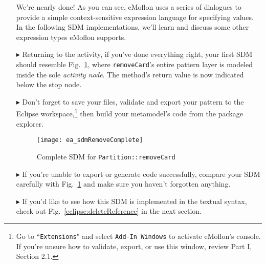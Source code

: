\begin{itemize}
\vspace{0.5cm}

We're nearly done! As you can see, eMoflon uses a series of dialogues to provide a simple context-sensitive expression language for specifying  values. In the
following SDM implementations, we'll learn and discuss some other expression types eMoflon supports.

\vspace{0.5cm}

\item[$\blacktriangleright$] Returning to the activity, if you've done everything right, your first SDM should resemble
Fig.~\ref{ea:sdm_complete_control_flow}, where \texttt{removeCard}'s entire pattern layer is modeled inside the sole \emph{activity node}. The method's return
value is now indicated below the stop node.

\vspace{0.5cm}

\item[$\blacktriangleright$]  Don't forget to save your files, validate and export your pattern to the Eclipse workspace,\footnote{Go to
``\texttt{Extensions}" and select \texttt{Add-In Windows} to activate eMoflon's console. If you're unsure how to validate, export, or use this window, review
Part I, Section 2.1.} then build your metamodel's code from the package explorer.

\newpage

\begin{figure}[htbp]
\begin{center}
  \texttt{[image: ea\_sdmRemoveComplete]}
  \caption{Complete SDM for \texttt{Partition::removeCard}}  
  \label{ea:sdm_complete_control_flow}
\end{center}
\end{figure}

\item[$\blacktriangleright$] If you're unable to export or generate code successfully, compare your SDM carefully with Fig.~\ref{ea:sdm_complete_control_flow}
and make sure you haven't forgotten anything.

\vspace{0.5cm}

\item[$\blacktriangleright$] If you'd like to see how this SDM is implemented in the textual syntax, check out Fig.~\ref{eclipse:deleteReference} in the
next section.


\end{itemize}


